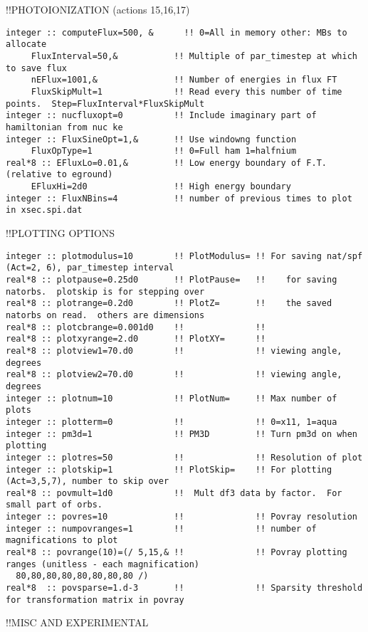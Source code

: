 !!{\large \quad PHOTOIONIZATION (actions 15,16,17)}
\begin{verbatim}
integer :: computeFlux=500, &      !! 0=All in memory other: MBs to allocate
     FluxInterval=50,&           !! Multiple of par_timestep at which to save flux
     nEFlux=1001,&               !! Number of energies in flux FT
     FluxSkipMult=1              !! Read every this number of time points.  Step=FluxInterval*FluxSkipMult
integer :: nucfluxopt=0          !! Include imaginary part of hamiltonian from nuc ke 
integer :: FluxSineOpt=1,&       !! Use windowng function
     FluxOpType=1                !! 0=Full ham 1=halfnium 
real*8 :: EFluxLo=0.01,&         !! Low energy boundary of F.T. (relative to eground)
     EFluxHi=2d0                 !! High energy boundary
integer :: FluxNBins=4           !! number of previous times to plot in xsec.spi.dat
\end{verbatim}
!!{\large \quad PLOTTING OPTIONS }
\begin{verbatim}
integer :: plotmodulus=10        !! PlotModulus= !! For saving nat/spf (Act=2, 6), par_timestep interval
real*8 :: plotpause=0.25d0       !! PlotPause=   !!    for saving natorbs.  plotskip is for stepping over
real*8 :: plotrange=0.2d0        !! PlotZ=       !!    the saved natorbs on read.  others are dimensions
real*8 :: plotcbrange=0.001d0    !!              !!    
real*8 :: plotxyrange=2.d0       !! PlotXY=      !!    
real*8 :: plotview1=70.d0        !!              !! viewing angle, degrees
real*8 :: plotview2=70.d0        !!              !! viewing angle, degrees
integer :: plotnum=10            !! PlotNum=     !! Max number of plots
integer :: plotterm=0            !!              !! 0=x11, 1=aqua
integer :: pm3d=1                !! PM3D         !! Turn pm3d on when plotting
integer :: plotres=50            !!              !! Resolution of plot
integer :: plotskip=1            !! PlotSkip=    !! For plotting (Act=3,5,7), number to skip over
real*8 :: povmult=1d0            !!  Mult df3 data by factor.  For small part of orbs.
integer :: povres=10             !!              !! Povray resolution
integer :: numpovranges=1        !!              !! number of magnifications to plot
real*8 :: povrange(10)=(/ 5,15,& !!              !! Povray plotting ranges (unitless - each magnification)
  80,80,80,80,80,80,80,80 /)
real*8  :: povsparse=1.d-3       !!              !! Sparsity threshold for transformation matrix in povray
\end{verbatim}
!!{\large \quad MISC AND EXPERIMENTAL}
